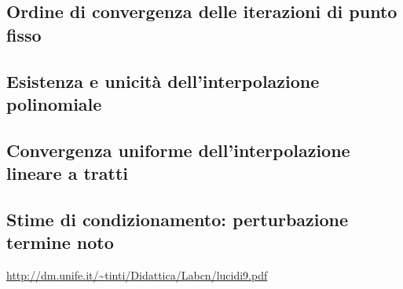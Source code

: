 \subsection{Ordine di convergenza delle iterazioni di punto fisso}

\subsection{Esistenza e unicità dell'interpolazione polinomiale}

\subsection{Convergenza uniforme dell'interpolazione lineare a tratti}

\subsection{Stime di condizionamento: perturbazione termine noto}
\url{http://dm.unife.it/~tinti/Didattica/Labcn/lucidi9.pdf}